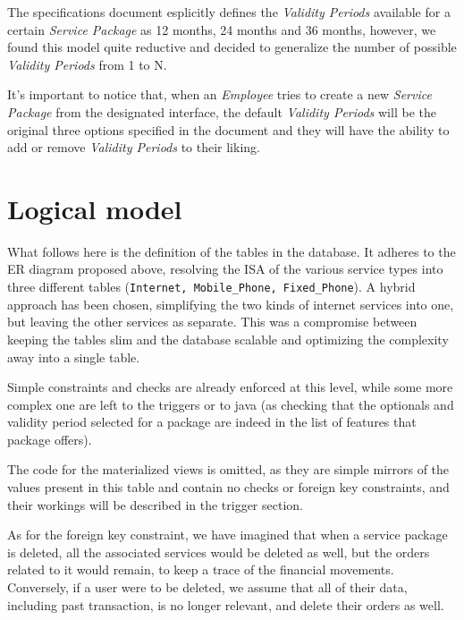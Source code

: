 The specifications document esplicitly defines the \textit{Validity Periods} available for a certain \textit{Service Package} as 12 months, 24 months and 36 months, however, we found this model quite reductive and decided to generalize the number of possible \textit{Validity Periods} from 1 to N.

It's important to notice that, when an \textit{Employee} tries to create a new \textit{Service Package} from the designated interface, the default \textit{Validity Periods} will be the original three options specified in the document and they will have the ability to add or remove \textit{Validity Periods} to their liking.


\section{Logical model}
\label{sec:logical_model}

What follows here is the definition of the tables in the database. It adheres to the ER diagram proposed above, resolving the ISA of the various service types into three different tables (\texttt{Internet, Mobile_Phone, Fixed_Phone}). A hybrid approach has been chosen, simplifying the two kinds of internet services into one, but leaving the other services as separate. This was a compromise between keeping the tables slim and the database scalable and optimizing the complexity away into a single table.

Simple constraints and checks are already enforced at this level, while some more complex one are left to the triggers or to java (as checking that the optionals and validity period selected for a package are indeed in the list of features that package offers).

The code for the materialized views is omitted, as they are simple mirrors of the values present in this table and contain no checks or foreign key constraints, and their workings will be described in the trigger section.

As for the foreign key constraint, we have imagined that when a service package is deleted, all the associated services would be deleted as well, but the orders related to it would remain, to keep a trace of the financial movements. Conversely, if a user were to be deleted, we assume that all of their data, including past transaction, is no longer relevant, and delete their orders as well.

